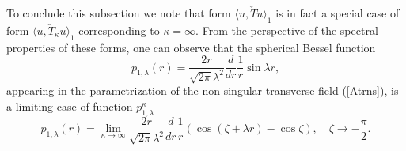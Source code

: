 \documentclass[12pt]{article}
\begin{document}
	To conclude this subsection we note that form
$ \langle u, \check{T} u\rangle_{1} $
	is in fact a special case of form
$ \langle u, \check{T}_{\kappa} u\rangle_{1} $
	corresponding to
$ \kappa = \infty $.
	From the perspective of the spectral properties of these forms,
	one can observe that the spherical Bessel function
\begin{equation*}
    p_{1,\lambda}(r) = \frac{2r}{\sqrt{2\pi}\lambda^{2}}
	\frac{d}{dr}\frac{1}{r} \sin \lambda r ,
\end{equation*}
	appearing in the parametrization of the non-singular transverse field
(\ref{Atrns}),
	is a limiting case of function
$ p_{1,\lambda}^{\kappa} $
\begin{equation*}
    p_{1,\lambda}(r)  
        = \lim_{\kappa\to\infty}
    \frac{2r}{\sqrt{2\pi}\lambda^{2}} \frac{d}{dr}\frac{1}{r}
    (\cos(\zeta +\lambda r) - \cos\zeta) ,\quad \zeta\to -\frac{\pi}{2}.
\end{equation*}
\end{document}
